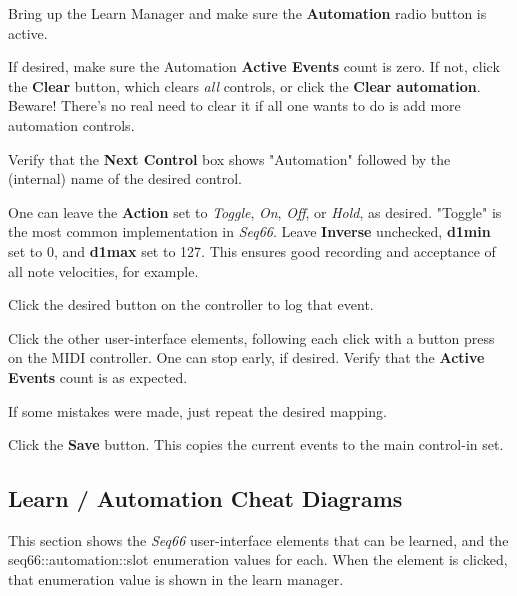    \begin{enumber}
      \item Bring up the Learn Manager and make sure the
         \textbf{Automation} radio button is active.
      \item If desired,
         make sure the Automation \textbf{Active Events} count is zero.
         If not, click the \textbf{Clear} button, which clears
         \textsl{all} controls, or click the \textbf{Clear automation}.
         Beware!
         There's no real need to clear it if all one wants to do
         is add more automation controls.
      \item Verify that the \textbf{Next Control} box shows
         "Automation" followed by the (internal)
         name of the desired control.
      \item One can leave the \textbf{Action} set to
         \textsl{Toggle},
         \textsl{On},
         \textsl{Off}, or
         \textsl{Hold}, as desired. "Toggle" is the most common
         implementation in \textsl{Seq66}.
         Leave \textbf{Inverse} unchecked, \textbf{d1min} set to 0,
         and \textbf{d1max} set to 127.
         This ensures good recording and acceptance of all note velocities,
         for example.
      \item Click the desired button on the controller to log that event.
      \item Click the other user-interface elements, following each
         click with a button press on the MIDI controller.
         One can stop early, if desired.
         Verify that the \textbf{Active Events} count is
         as expected.
      \item If some mistakes were made, just repeat the desired
         mapping.
      \item Click the \textbf{Save} button.
         This copies the current events to the main control-in set.
   \end{enumber}

\subsection{Learn / Automation Cheat Diagrams}
\label{subsec:midi_learn_automation_cheat_diagrams}

   This section shows the \textsl{Seq66} user-interface elements that
   can be learned, and the seq66::automation::slot enumeration values
   for each. When the element is clicked, that enumeration value
   is shown in the learn manager.

